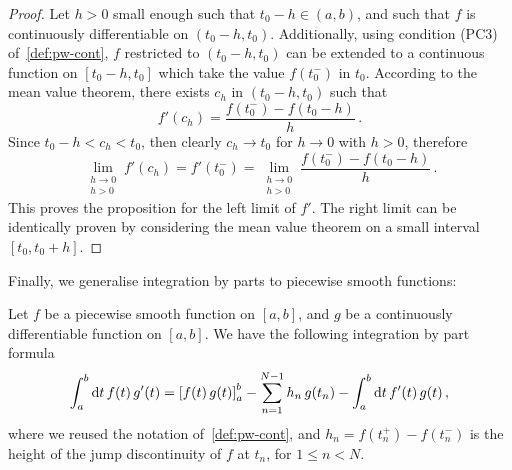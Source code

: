 \begin{proof}
  Let $h>0$ small enough such that $t_0-h\in(a,b)$, and such that $f$ is continuously
  differentiable on $(t_0-h,t_0)$. Additionally, using condition (PC3)
  of~\cref{def:pw-cont}, $f$ restricted to $(t_0-h,t_0)$ can be extended to a continuous
  function on $[t_0-h,t_0]$ which take the value $f(t_0^-)$ in $t_0$. According to the
  mean value theorem, there exists $c_h$ in $(t_0-h,t_0)$ such that
  \begin{equation}
    f'(c_h)=\frac{f(t_0^-)-f(t_0-h)}{h}\,.
  \end{equation}
  Since $t_0-h<c_h<t_0$, then clearly $c_h\to t_0$ for $h\to 0$ with $h>0$, therefore
  \begin{equation}
    \lim_{\substack{h\to0\\h>0}}f'(c_h)=f'(t_0^-)
    =\lim_{\substack{h\to0\\h>0}}\frac{f(t_0^-)-f(t_0-h)}{h}\,.
  \end{equation}
  This proves the proposition for the left limit of $f'$. The right limit can be
  identically proven by considering the mean value theorem on a small interval
  $[t_0,t_0+h]$.
\end{proof}
Finally, we generalise integration by parts to piecewise smooth functions:
\begin{theorem}
  \label{thm:pw-smooth-intpart}
  Let $f$ be a piecewise smooth function on $[a,b]$, and $g$ be a continuously
  differentiable function on $[a,b]$. We have the following integration by part formula
  \begin{equation}
    \int_a^b\mathrm{d} t\,f(t)\,g'(t)=\left[f(t)\,g(t)\right]_a^b
    -\sum_{n=1}^{N-1}h_n\,g(t_n)
    -\int_a^b\mathrm{d} t\, f'(t)\,g(t)\,,\label{eq:pw-smooth-intpart}
  \end{equation}
  where we reused the notation of~\cref{def:pw-cont}, and $h_n=f(t_n^+)-f(t_n^-)$ is the
  height of the jump discontinuity of $f$ at $t_n$, for $1\leq n<N$.
\end{theorem}
